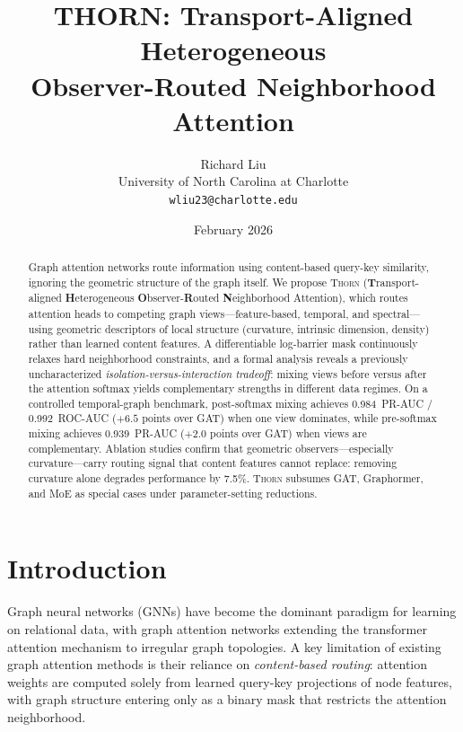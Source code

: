 \documentclass[11pt,a4paper]{article}
\title{%
  \textsc{THORN}: Transport-Aligned Heterogeneous\\
  Observer-Routed Neighborhood Attention}
\author{%
  Richard Liu\\
  University of North Carolina at Charlotte\\
  \texttt{wliu23@charlotte.edu}
}
\date{February 2026}
\newcommand{\thorn}{\textsc{Thorn}}
\begin{document}
\maketitle

\begin{abstract}
Graph attention networks route information using content-based
query-key similarity, ignoring the geometric structure of the graph
itself.
We propose \thorn{} (\textbf{T}ransport-aligned \textbf{H}eterogeneous
\textbf{O}bserver-\textbf{R}outed \textbf{N}eighborhood Attention),
which routes attention heads to competing graph views---feature-based,
temporal, and spectral---using geometric descriptors of local structure
(curvature, intrinsic dimension, density) rather than learned content
features.
A differentiable log-barrier mask continuously relaxes hard neighborhood
constraints, and a formal analysis reveals a previously uncharacterized
\emph{isolation-versus-interaction tradeoff}: mixing views before versus
after the attention softmax yields complementary strengths in different
data regimes.
On a controlled temporal-graph benchmark, post-softmax mixing achieves
0.984~PR-AUC / 0.992~ROC-AUC ($+6.5$ points over GAT) when one view
dominates, while pre-softmax mixing achieves 0.939~PR-AUC ($+2.0$
points over GAT) when views are complementary.
Ablation studies confirm that geometric observers---especially
curvature---carry routing signal that content features cannot replace:
removing curvature alone degrades performance by 7.5\%.
\thorn{} subsumes GAT, Graphormer, and MoE as special cases under
parameter-setting reductions.
\end{abstract}

\section{Introduction}
\label{sec:intro}

Graph neural networks (GNNs) have become the dominant paradigm for
learning on relational data, with graph attention networks
\citep{velickovic2018graph, brody2022how} extending the transformer
attention mechanism \citep{vaswani2017attention} to irregular graph
topologies.
A key limitation of existing graph attention methods is their reliance on
\emph{content-based routing}: attention weights are computed solely from
learned query-key projections of node features, with graph structure
entering only as a binary mask that restricts the attention neighborhood.
\end{document}
